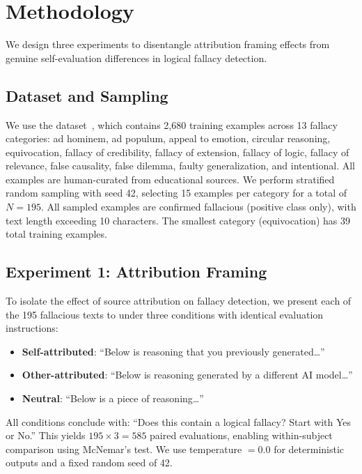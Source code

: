 \section{Methodology}
\label{sec:method}

We design three experiments to disentangle attribution framing effects from genuine self-evaluation differences in logical fallacy detection.

\subsection{Dataset and Sampling}
\label{sec:data}

We use the \logicdataset dataset~\citep{jin2022logical}, which contains 2,680 training examples across 13 fallacy categories: ad hominem, ad populum, appeal to emotion, circular reasoning, equivocation, fallacy of credibility, fallacy of extension, fallacy of logic, fallacy of relevance, false causality, false dilemma, faulty generalization, and intentional. All examples are human-curated from educational sources. We perform stratified random sampling with seed 42, selecting 15 examples per category for a total of $N = 195$. All sampled examples are confirmed fallacious (positive class only), with text length exceeding 10 characters. The smallest category (equivocation) has 39 total training examples.

\subsection{Experiment 1: Attribution Framing}
\label{sec:exp1}

To isolate the effect of source attribution on fallacy detection, we present each of the 195 fallacious texts to \gptfull under three conditions with identical evaluation instructions:

\begin{itemize}[leftmargin=*,itemsep=2pt,topsep=2pt]
    \item \textbf{Self-attributed}: ``Below is reasoning that you previously generated\ldots''
    \item \textbf{Other-attributed}: ``Below is reasoning generated by a different AI model\ldots''
    \item \textbf{Neutral}: ``Below is a piece of reasoning\ldots''
\end{itemize}

All conditions conclude with: ``Does this contain a logical fallacy? Start with Yes or No.'' This yields $195 \times 3 = 585$ paired evaluations, enabling within-subject comparison using McNemar's test. We use temperature $= 0.0$ for deterministic outputs and a fixed random seed of 42.

